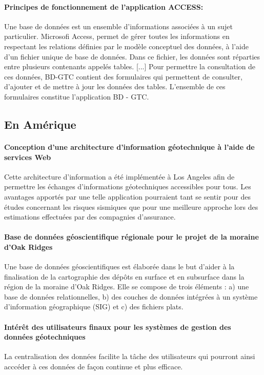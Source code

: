        \paragraph{ Principes de fonctionnement de l'application ACCESS: }
       Une base de données est un ensemble d'informations associées à un sujet particulier.
        Microsofi Access, permet de gérer toutes les informations en respectant les relations définies
        par le modèle conceptuel des données, à l'aide d'un fichier unique de base de données. Dans
        ce fichier, les données sont réparties entre plusieurs contenants appelés tables. [...]
        Pour permettre la consultation de ces données, BD-GTC contient des formulaires qui
        permettent de consulter, d'ajouter et de mettre à jour les données des tables. L'ensemble de ces
        formulaires constitue l'application BD - GTC.
        \cite{Cayenne}

        \subsection{En Amérique}
        \paragraph{Conception d'une architecture d'information géotechnique à l'aide de services Web}
        Cette architecture d'information a été implémentée à Los Angeles afin de permettre les échanges 
        d'informations géotechniques accessibles pour tous. Les avantages apportés par une telle 
        application pourraient tant se sentir pour des études concernant les risques sismiques que pour 
        une meilleure approche lors des estimations effectuées par des compagnies d'assurance. 
        \cite{zimmermann2003design}
        \paragraph{Base de données géoscientifique régionale pour le projet de la moraine d'Oak Ridges}
        Une base de données géoscientifiques est élaborée dans le but d’aider à la finalisation de la 
        cartographie des dépôts en surface et en subsurface dans la région de la moraine d’Oak 
        Ridges. Elle se compose de trois éléments : a) une base de données relationnelles, 
        b) des couches de données intégrées à un système d’information géographique (SIG) 
        et c) des fichiers plats.
        \cite{russell1996regional}
        \paragraph{Intérêt des utilisateurs finaux pour les systèmes de gestion des données géotechniques}
        La centralisation des données facilite la tâche des utilisateurs qui pourront ainsi acccéder à ces
        données de façon continue et plus efficace.
        \cite{turner2008end}

